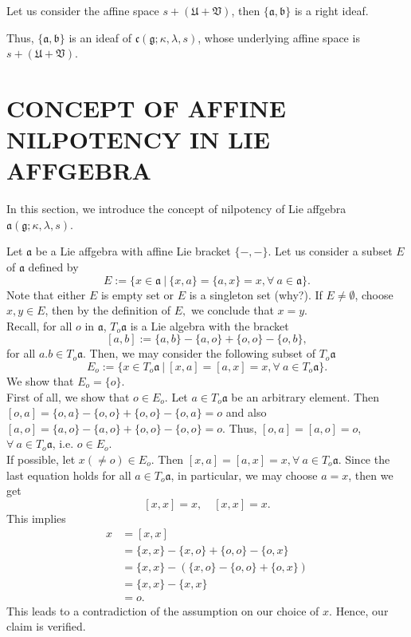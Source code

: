 \documentclass{article}
\theoremstyle{definition}
\theoremstyle{remark}
\theoremstyle{plain}
\begin{document}
Let us consider the affine space $s+(\mathfrak{U+V})$, then $\{\mathfrak{a}, \mathfrak{b}\}$ is a right ideaf.

Thus, $\{\mathfrak{a}, \mathfrak{b}\}$ is an ideaf of $\mathfrak{c}(\mathfrak{g}; \kappa, \lambda, s)$, whose underlying affine space is $s+(\mathfrak{U+V})$.


\section{CONCEPT OF AFFINE NILPOTENCY IN LIE AFFGEBRA}

In this section, we introduce the concept of nilpotency of Lie affgebra $\mathfrak{a}(\mathfrak{g}; \kappa, \lambda, s)$.


Let $\mathfrak{a}$ be a Lie affgebra with affine Lie bracket $\{-,-\}$. Let us consider a subset $E$ of $\mathfrak{a}$ defined by 
\begin{equation}\label{set E}
E:=\{ x\in \mathfrak{a}~|~ \{x,a\}=\{a, x\}=x, \forall~ a\in \mathfrak{a}\}.
\end{equation}
Note that either $E$ is empty set or $E$ is a singleton set (why?). If $E\neq \emptyset$, choose $x, y\in E$, then by the definition of $E,$ we conclude that $x=y.$\\
Recall, for all $o$ in $\mathfrak{a}$, $T_o\mathfrak{a}$ is a Lie algebra with the bracket $$[a, b]:=\{a,b\}-\{a,o\}+\{o,o\}-\{o,b\},$$
for all $a. b\in T_o\mathfrak{a}.$ Then, we may consider the following subset of $T_o\mathfrak{a}$
\begin{equation}\label{set E0}
E_o:=\{ x\in T_o\mathfrak{a}~|~ [x, a]=[a, x]=x, \forall~ a\in T_o\mathfrak{a}\}.
\end{equation}
We show that $E_o=\{o\}.$\\
First of all, we show that $o\in E_o$. Let $a\in T_o\mathfrak{a}$ be an arbitrary element. Then $[o,a]=\{o,a\}-\{o,o\}+\{o,o\}-\{o,a\}=o$ and also $[a,o]=\{a,o\}-\{a,o\}+\{o,o\}-\{o,o\}=o.$ Thus, $[o,a]=[a,o]=o$, $\forall~ a\in T_o\mathfrak{a}$, i.e. $o\in E_o.$\\ If possible, let $x(\neq o)\in E_o$. Then $[x, a]=[a,x]=x, \forall~ a\in T_o\mathfrak{a}$. Since the last equation holds for all $a\in T_o\mathfrak{a}$, in particular, we may choose $a=x$, then we get $$[x,x]=x, \quad [x,x]=x. $$
This implies \begin{align*}
 x&=[x,x]\\
 &=\{x,x\}-\{x,o\}+\{o,o\}-\{o,x\}\\
 &=\{x,x\}-(\{x,o\}-\{o,o\}+\{o,x\})\\
 &=\{x,x\}-\{x,x\}\\
 &=o.
\end{align*}
This leads to a contradiction of the assumption on our choice of $x.$ Hence, our claim is verified. 
\end{document}
